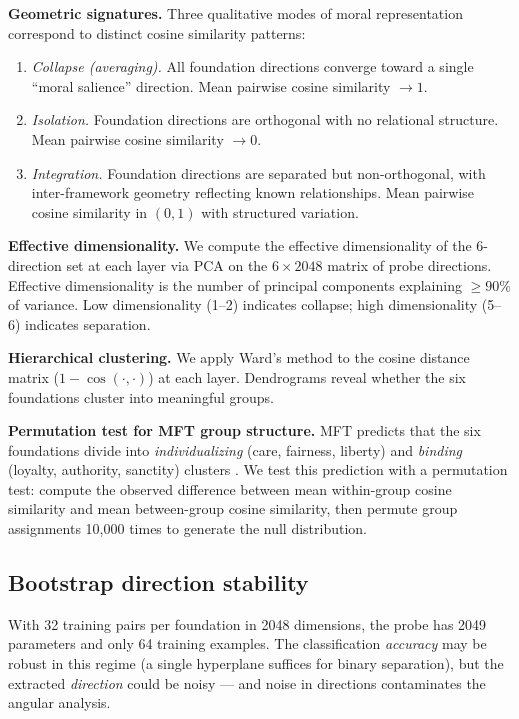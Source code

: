 \textbf{Geometric signatures.} Three qualitative modes of moral
representation correspond to distinct cosine similarity patterns:

\begin{enumerate}
\def\labelenumi{\arabic{enumi}.}
\item
  \emph{Collapse (averaging).} All foundation directions converge
  toward a single ``moral salience'' direction. Mean pairwise
  cosine similarity \(\to 1\).
\item
  \emph{Isolation.} Foundation directions are orthogonal with no
  relational structure. Mean pairwise cosine similarity \(\to 0\).
\item
  \emph{Integration.} Foundation directions are separated but
  non-orthogonal, with inter-framework geometry reflecting known
  relationships. Mean pairwise cosine similarity in \((0, 1)\) with
  structured variation.
\end{enumerate}

\textbf{Effective dimensionality.} We compute the effective
dimensionality of the 6-direction set at each layer via PCA on
the \(6 \times 2048\) matrix of probe directions. Effective
dimensionality is the number of principal components explaining
\(\geq 90\%\) of variance. Low dimensionality (1--2) indicates
collapse; high dimensionality (5--6) indicates separation.

\textbf{Hierarchical clustering.} We apply Ward's method to the cosine
distance matrix (\(1 - \cos(\cdot, \cdot)\)) at each layer.
Dendrograms reveal whether the six foundations cluster into
meaningful groups.

\textbf{Permutation test for MFT group structure.} MFT predicts that
the six foundations divide into \emph{individualizing} (care, fairness,
liberty) and \emph{binding} (loyalty, authority, sanctity) clusters
\citep{graham2013mft}. We test this prediction with a permutation
test: compute the observed difference between mean within-group
cosine similarity and mean between-group cosine similarity, then
permute group assignments 10,000 times to generate the null
distribution.

\subsection{Bootstrap direction stability}\label{bootstrap-direction-stability}

With 32 training pairs per foundation in 2048 dimensions, the probe
has 2049 parameters and only 64 training examples. The classification
\emph{accuracy} may be robust in this regime (a single hyperplane suffices
for binary separation), but the extracted \emph{direction} could be noisy
--- and noise in directions contaminates the angular analysis.

